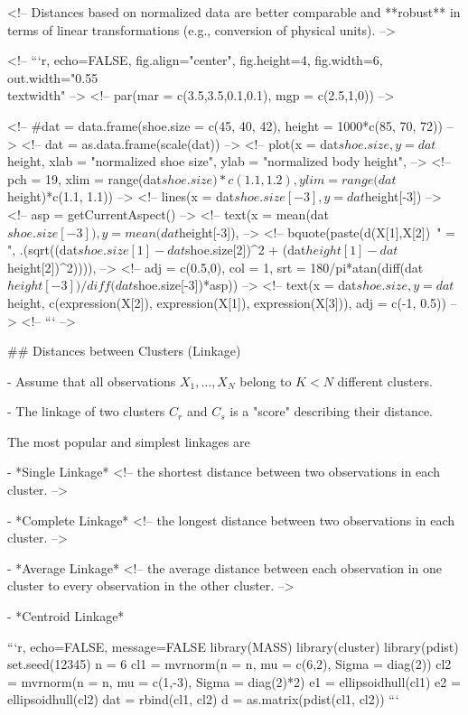 <!-- Distances based on normalized data are better comparable and **robust** in terms of linear transformations (e.g., conversion of physical units). -->

<!-- ```{r, echo=FALSE, fig.align="center", fig.height=4, fig.width=6, out.width="0.55\\textwidth"} -->
<!-- par(mar = c(3.5,3.5,0.1,0.1), mgp = c(2.5,1,0)) -->

<!-- #dat = data.frame(shoe.size = c(45, 40, 42), height = 1000*c(85, 70, 72)) -->
<!-- dat = as.data.frame(scale(dat)) -->
<!-- plot(x = dat$shoe.size, y = dat$height, xlab = "normalized shoe size", ylab = "normalized body height",  -->
<!--   pch = 19, xlim = range(dat$shoe.size)*c(1.1, 1.2), ylim = range(dat$height)*c(1.1, 1.1)) -->
<!-- lines(x = dat$shoe.size[-3], y = dat$height[-3]) -->
<!-- asp = getCurrentAspect() -->
<!-- text(x = mean(dat$shoe.size[-3]), y = mean(dat$height[-3]),  -->
<!--   bquote(paste(d(X[1],X[2])~" = ", .(sqrt((dat$shoe.size[1]-dat$shoe.size[2])^2 + (dat$height[1]-dat$height[2])^2)))),  -->
<!--   adj = c(0.5,0), col = 1, srt = 180/pi*atan(diff(dat$height[-3])/diff(dat$shoe.size[-3])*asp)) -->
<!-- text(x = dat$shoe.size, y = dat$height, c(expression(X[2]), expression(X[1]), expression(X[3])), adj = c(-1, 0.5)) -->
<!-- ``` -->

## Distances between Clusters (Linkage)

- Assume that all observations $X_1,\hdots , X_N$ belong to $K<N$ different clusters.

- The linkage of two clusters $C_r$ and $C_s$ is a "score" describing their distance.

The most popular and simplest linkages are

- *Single Linkage* <!-- the shortest distance between two observations in each cluster.  -->

- *Complete Linkage* <!-- the longest distance between two observations in each cluster. -->

- *Average Linkage* <!-- the average distance between each observation in one cluster to every observation in the other cluster. -->

- *Centroid Linkage*

```{r, echo=FALSE, message=FALSE}
library(MASS)
library(cluster)
library(pdist)
set.seed(12345)
n = 6
cl1 = mvrnorm(n = n, mu = c(6,2), Sigma = diag(2))
cl2 = mvrnorm(n = n, mu = c(1,-3), Sigma = diag(2)*2)
e1 = ellipsoidhull(cl1)
e2 = ellipsoidhull(cl2)
dat = rbind(cl1, cl2)
d = as.matrix(pdist(cl1, cl2))
```

